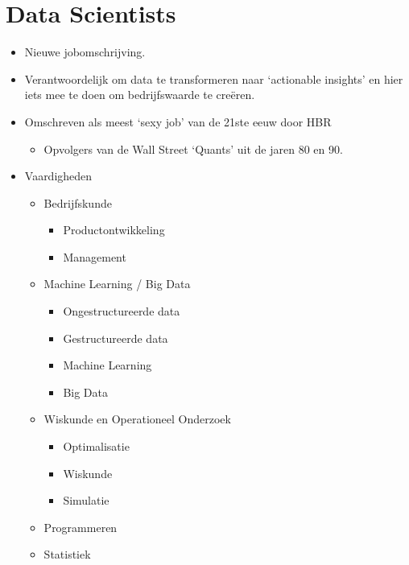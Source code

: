 \documentclass[]{memoir}
\providecommand{\tightlist}{%
  \setlength{\itemsep}{0pt}\setlength{\parskip}{0pt}}
\begin{document}
\hypertarget{data-scientists}{%
\section{Data Scientists}\label{data-scientists}}

\begin{itemize}
\tightlist
\item
  Nieuwe jobomschrijving.
\item
  Verantwoordelijk om data te transformeren naar `actionable insights' en hier iets mee te doen om bedrijfswaarde te creëren.
\item
  Omschreven als meest `sexy job' van de 21ste eeuw door HBR

  \begin{itemize}
  \tightlist
  \item
    Opvolgers van de Wall Street `Quants' uit de jaren 80 en 90.
  \end{itemize}
\item
  Vaardigheden

  \begin{itemize}
  \tightlist
  \item
    Bedrijfskunde

    \begin{itemize}
    \tightlist
    \item
      Productontwikkeling
    \item
      Management
    \end{itemize}
  \item
    Machine Learning / Big Data

    \begin{itemize}
    \tightlist
    \item
      Ongestructureerde data
    \item
      Gestructureerde data
    \item
      Machine Learning
    \item
      Big Data
    \end{itemize}
  \item
    Wiskunde en Operationeel Onderzoek

    \begin{itemize}
    \tightlist
    \item
      Optimalisatie
    \item
      Wiskunde
    \item
      Simulatie
    \end{itemize}
  \item
    Programmeren
  \item
    Statistiek


\end{itemize}
\end{itemize}
\end{document}
